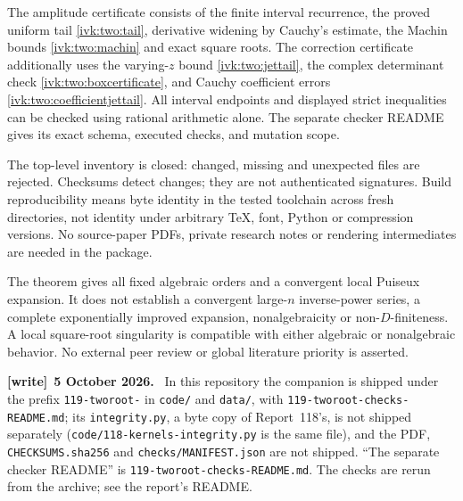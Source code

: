 \documentclass[11pt,letterpaper]{article}
\theoremstyle{remark}\newtheorem{remark}[theorem]{Remark}
\newcommand{\file}[1]{\nolinkurl{#1}}
\newenvironment{writenote}[1][]{\par\smallskip\begingroup\small
 \noindent\textbf{[write]}\if\relax\detokenize{#1}\relax\else~\textbf{#1.}\fi\ }%
 {\par\endgroup\smallskip}
\begin{document}
The amplitude certificate consists of the finite interval recurrence,
the proved uniform tail \eqref{ivk:two:tail}, derivative widening by Cauchy's
estimate, the Machin bounds \eqref{ivk:two:machin} and exact square roots.
The correction certificate additionally uses the varying-$z$ bound
\eqref{ivk:two:jettail}, the complex determinant check \eqref{ivk:two:boxcertificate},
and Cauchy coefficient errors \eqref{ivk:two:coefficientjettail}. All interval
endpoints and displayed strict inequalities can be checked using
rational arithmetic alone. The separate checker README
gives its exact schema, executed checks, and mutation scope.

The top-level inventory is closed: changed, missing and unexpected
files are rejected. Checksums detect changes; they are not authenticated
signatures. Build reproducibility means byte identity in the tested
toolchain across fresh directories, not identity under arbitrary TeX,
font, Python or compression versions. No source-paper PDFs, private
research notes or rendering intermediates are needed in the package.

The theorem gives all fixed algebraic orders and a convergent local
Puiseux expansion. It does not establish a convergent large-$n$
inverse-power series, a complete exponentially improved expansion,
nonalgebraicity or non-$D$-finiteness. A local square-root singularity
is compatible with either algebraic or nonalgebraic behavior.
No external peer review or global literature priority is asserted.

\begin{writenote}[5 October 2026]
In this repository the companion is shipped under the prefix \file{119-tworoot-} in \file{code/} and \file{data/}, with \file{119-tworoot-checks-README.md}; its \file{integrity.py}, a byte copy of Report~118's, is not shipped separately (\file{code/118-kernels-integrity.py} is the same file), and the PDF, \file{CHECKSUMS.sha256} and \file{checks/MANIFEST.json} are not shipped. ``The separate checker README'' is \file{119-tworoot-checks-README.md}. The checks are rerun from the archive; see the report's README.
\end{writenote}
\end{document}
